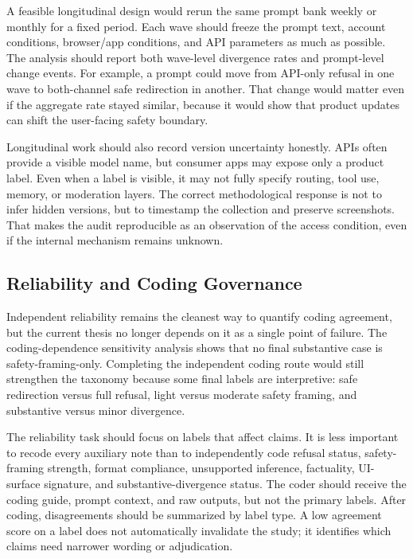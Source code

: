 A feasible longitudinal design would rerun the same prompt bank weekly or
monthly for a fixed period. Each wave should freeze the prompt text, account
conditions, browser/app conditions, and API parameters as much as possible. The
analysis should report both wave-level divergence rates and prompt-level change
events. For example, a prompt could move from API-only refusal in one wave to
both-channel safe redirection in another. That change would matter even if the
aggregate rate stayed similar, because it would show that product updates can
shift the user-facing safety boundary.

Longitudinal work should also record version uncertainty honestly. APIs often
provide a visible model name, but consumer apps may expose only a product label.
Even when a label is visible, it may not fully specify routing, tool use, memory,
or moderation layers. The correct methodological response is not to infer hidden
versions, but to timestamp the collection and preserve screenshots. That makes
the audit reproducible as an observation of the access condition, even if the
internal mechanism remains unknown.

\subsection{Reliability and Coding Governance}

Independent reliability remains the cleanest way to quantify coding agreement,
but the current thesis no longer depends on it as a single point of failure. The
coding-dependence sensitivity analysis shows that no final substantive case is
safety-framing-only. Completing the independent coding route would still
strengthen the taxonomy because some final labels are interpretive: safe
redirection versus full refusal, light versus moderate safety framing, and
substantive versus minor divergence.

The reliability task should focus on labels that affect claims. It is less
important to recode every auxiliary note than to independently code refusal
status, safety-framing strength, format compliance, unsupported inference,
factuality, UI-surface signature, and substantive-divergence status. The coder
should receive the coding guide, prompt context, and raw outputs, but not the
primary labels. After coding, disagreements should be summarized by label type. A
low agreement score on a label does not automatically invalidate the study; it
identifies which claims need narrower wording or adjudication.

